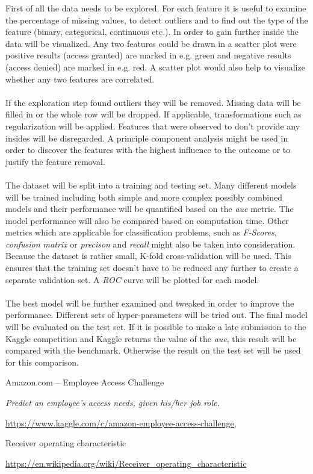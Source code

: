 \documentclass[11pt]{article}
\begin{document}
First of all the data needs to be explored. For each feature it is useful to examine the 
percentage of missing values, to detect outliers and to find out the type of the 
feature (binary, categorical, continuous etc.). 
In order to gain further inside the data will be visualized. Any two features could be drawn 
in a scatter plot were positive results (access granted) are marked in e.g. green and negative 
results (access denied) are marked in e.g. red.
A scatter plot would also help to visualize whether any two features are correlated.
\\ \\
If the exploration step found outliers they will be removed. Missing data will be filled in or
the whole row will be dropped. If applicable, transformations 
such as regularization will be applied. Features that were observed to don't provide any 
insides will be disregarded. A principle component analysis might be used in order to 
discover the features with the highest influence to the outcome or to justify 
the feature removal.
\\ \\
The dataset will be split into a training and testing set.
Many different models will be trained including both simple and more complex possibly combined models
and their performance will be quantified based on the {\it auc} metric. The model performance will 
also be compared based on computation time.
Other metrics which are applicable for classification problems, 
such as {\it F-Scores}, {\it confusion matrix} or {\it precison} and {\it recall} might also be 
taken into consideration.
Because the dataset is rather small, K-fold cross-validation 
will be used. This ensures that the training set doesn't have to be reduced any further to 
create a separate validation set.
A {\it ROC} curve will be plotted for each model.
\\ \\
The best model will be further examined and tweaked in order to improve the performance. 
Different sets of hyper-parameters will be tried out. The final model will be evaluated on the test set.
If it is possible to make a late submission to the Kaggle competition and Kaggle returns the 
value of the {\it auc}, this result will be compared with the benchmark. Otherwise the result on the
test set will be used for this comparison.

\newpage

    \begin{thebibliography}{9}

        Amazon.com -- Employee Access Challenge 

        \textit{Predict an employee's access needs, given his/her job role.}

        \href{https://www.kaggle.com/c/amazon-employee-access-challenge}
        {https://www.kaggle.com/c/amazon-employee-access-challenge},


        Receiver operating characteristic 

        \href{https://en.wikipedia.org/wiki/Receiver_operating_characteristic}
        {https://en.wikipedia.org/wiki/Receiver\_operating\_characteristic}

    \end{thebibliography}
\end{document}
